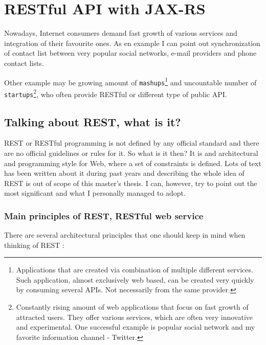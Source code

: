 \chapter{RESTful API with JAX-RS}\label{rest}

	Nowadays, Internet consumers demand fast growth of various services and integration of their favourite ones. As en
	example I can point out synchronization of contact list between very popular social networks, e-mail providers and
	phone contact lists. 
	
	Other example may be growing amount of \verb|mashups|\footnote{Applications that are created via
	combination of multiple different services. Such application, almost exclusively web based, can be created very quickly
	by consuming several \gls{API}s. Not necessarily from the same provider.} and uncountable number of
	\verb|startups|\footnote{Constantly rising amount of web applications that focus on fast growth of attracted users.
	They offer various services, which are often very innovative and experimental. One successful example is popular
	social network and my favorite information channel - Twitter.}, who often provide RESTful or different type of public
	\gls{API}.

	\section{Talking about REST, what is it?}
	
	\gls{REST} or RESTful programming is not defined by any official standard and there are no official guidelines or rules
	for it.
	So what is it then? It is and architectural and programming style for Web, where a set of constraints is defined. Lots
	of text has been written about it during past years and describing the whole idea of REST is out of scope of this
	master's thesis. I can, however, try to point out the most significant and what I personally managed to adopt.
	
	\subsection{Main principles of REST, RESTful web service}
	
	There are several architectural principles that one should keep in mind when thinking of REST \cite[p.~3]{restful}:
	
